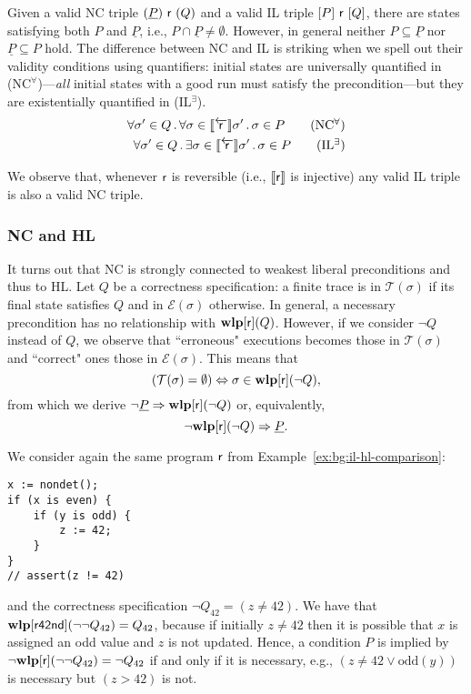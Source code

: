 Given a valid NC triple $(\underline{P})~\mathsf{r}~(Q)$ and a valid IL triple $[P]~\mathsf{r}~[Q]$, there are states satisfying both $P$ and $\underline{P}$, i.e., $P \cap \underline{P} \neq \emptyset$. However, in general neither $P \subseteq \underline{P}$ nor $\underline{P} \subseteq P$ hold. The difference between NC and IL is striking when we spell out their validity conditions using quantifiers: initial states are universally quantified in (NC$^{\forall}$)---\emph{all} initial states with a good run must satisfy the precondition---but they are existentially quantified in (IL$^{\exists}$).
\begin{align*}
	\forall \sigma' \in Q \sdot \forall \sigma\in \bwsem{\regr}\sigma' \sdot\sigma\in P
	\tag{NC$^{\forall}$} \\
	\forall \sigma' \in Q \sdot \exists \sigma\in \bwsem{\regr}\sigma' \sdot \sigma \in P
	\tag{IL$^{\exists}$}
\end{align*}

We observe that, whenever $\mathsf{r}$ is reversible (i.e., $\llbracket\mathsf{r}\rrbracket$ is injective) any valid IL triple is also a valid NC triple.

\subsubsection{NC and HL}
It turns out that NC is strongly connected to weakest liberal preconditions and thus to HL.
Let $Q$ be a correctness specification: a finite trace is in $\mathcal{T}(\sigma)$ if its final state satisfies $Q$ and in $\mathcal{E}(\sigma)$ otherwise.
In general, a necessary precondition has no relationship with $\textbf{wlp}[\mathsf{r}](Q)$. However, if we consider $\lnot Q$ instead of $Q$, we observe that ``erroneous" executions becomes those in $\mathcal{T}(\sigma)$ and ``correct" ones those in $\mathcal{E}(\sigma)$. This means that
\[
(\mathcal{T}(\sigma) = \emptyset) \Leftrightarrow \sigma \in \textbf{wlp}[\mathsf{r}](\lnot Q),
\]
from which we derive
\(\lnot \underline{P} \Rightarrow \textbf{wlp}[\mathsf{r}](\lnot Q)\)
or, equivalently,
\[\lnot \textbf{wlp}[\mathsf{r}](\lnot Q) \Rightarrow \underline{P} .\]

\begin{example}
	We consider again the same program $\mathsf{r}$ from Example~\ref{ex:bg:il-hl-comparison}:

	\begin{verbatim}
x := nondet();
if (x is even) {
	if (y is odd) {
		z := 42;
	}
}
// assert(z != 42)
	\end{verbatim}

	\noindent
	and the correctness specification $\neg Q_{42} = (z\neq 42)$. We have that $\textbf{wlp}[\mathsf{r42nd}](\lnot \lnot Q_{42}) = Q_{42}$, because if initially $z \neq 42$ then it is possible that $x$ is assigned an odd value and $z$ is not updated.
	Hence, a condition $P$ is implied by $\lnot \textbf{wlp}[\mathsf{r}](\lnot\lnot Q_{42}) = \lnot Q_{42}$ if and only if it is necessary, e.g., $(z\neq 42 \vee \text{odd}(y))$ is necessary but $(z > 42)$ is not.
\end{example}

